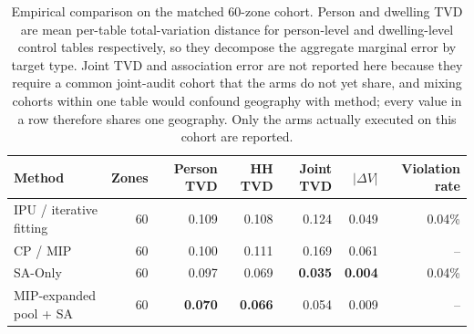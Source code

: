\begin{table}[htbp]
\centering
\small
\caption{Empirical comparison on the matched 60-zone cohort. Person and dwelling TVD are
mean per-table total-variation distance for person-level and dwelling-level control tables
respectively, so they decompose the aggregate marginal error by target type. Joint TVD and
association error are not reported here because they require a common joint-audit cohort
that the arms do not yet share, and mixing cohorts within one table would confound
geography with method; every value in a row therefore shares one geography. Only the arms
actually executed on this cohort are reported.}
\label{tab:matched-method-results}
\begin{tabular}{@{}lrrrrrr@{}}
\toprule
\textbf{Method} & \textbf{Zones} & \textbf{Person TVD} &
\textbf{HH TVD} & \textbf{Joint TVD} & \textbf{$|\Delta V|$} &
\textbf{Violation rate} \\
\midrule
IPU / iterative fitting  & 60 & 0.109 & 0.108 & 0.124 & 0.049 & 0.04\% \\
CP / MIP                 & 60 & 0.100 & 0.111 & 0.169 & 0.061 & -- \\
SA-Only                  & 60 & 0.097 & 0.069 & \textbf{0.035} & \textbf{0.004} & 0.04\% \\
MIP-expanded pool + SA   & 60 & \textbf{0.070} & \textbf{0.066} & 0.054 & 0.009 & -- \\
\bottomrule
\end{tabular}
\end{table}
